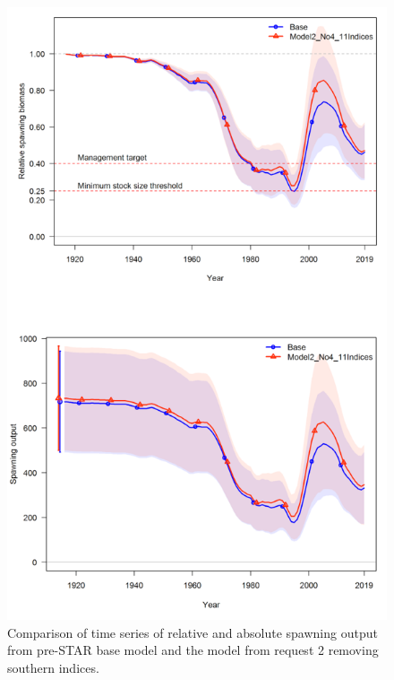 \documentclass[12pt,]{article}
\begin{document}
\begin{figure}
\centering
\includegraphics{Figures/STAR_request2.png}
\caption{Comparison of time series of relative and absolute spawning
output from pre-STAR base model and the model from request 2 removing
southern indices. \label{fig:STAR_request2}}
\end{figure}
\end{document}
